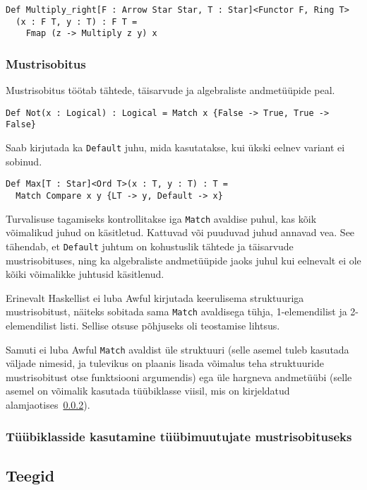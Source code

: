 \documentclass[12pt]{article}
\begin{document}
        \begin{verbatim}Def Multiply_right[F : Arrow Star Star, T : Star]<Functor F, Ring T>
  (x : F T, y : T) : F T =
    Fmap (z -> Multiply z y) x\end{verbatim}
      \subsubsection{Mustrisobitus}\label{match}
        Mustrisobitus töötab tähtede, täisarvude ja algebraliste andmetüüpide peal.

        \begin{verbatim}Def Not(x : Logical) : Logical = Match x {False -> True, True -> False}\end{verbatim}

        Saab kirjutada ka \verb!Default! juhu, mida kasutatakse, kui ükski eelnev variant ei sobinud.

        \begin{verbatim}Def Max[T : Star]<Ord T>(x : T, y : T) : T =
  Match Compare x y {LT -> y, Default -> x}\end{verbatim}

        Turvalisuse tagamiseks kontrollitakse iga \verb!Match! avaldise puhul, kas kõik võimalikud juhud on käsitletud. Kattuvad või puuduvad juhud annavad vea. See tähendab, et \verb!Default! juhtum on kohustuslik tähtede ja täisarvude mustrisobituses, ning ka algebraliste andmetüüpide jaoks juhul kui eelnevalt ei ole kõiki võimalikke juhtusid käsitlenud.

        Erinevalt Haskellist ei luba Awful kirjutada keerulisema struktuuriga mustrisobitust, näiteks sobitada sama \verb!Match! avaldisega tühja, 1-elemendilist ja 2-elemendilist listi. Sellise otsuse põhjuseks oli teostamise lihtsus.

        Samuti ei luba Awful \verb!Match! avaldist üle struktuuri (selle asemel tuleb kasutada väljade nimesid, ja tulevikus on plaanis lisada võimalus teha struktuuride mustrisobitust otse funktsiooni argumendis) ega üle hargneva andmetüübi (selle asemel on võimalik kasutada tüübiklasse viisil, mis on kirjeldatud alamjaotises~\ref{tyybiklassihakk}).
      \subsubsection{Tüübiklasside kasutamine tüübimuutujate mustrisobituseks}\label{tyybiklassihakk}
        
    \subsection{Teegid}
      
\end{document}
